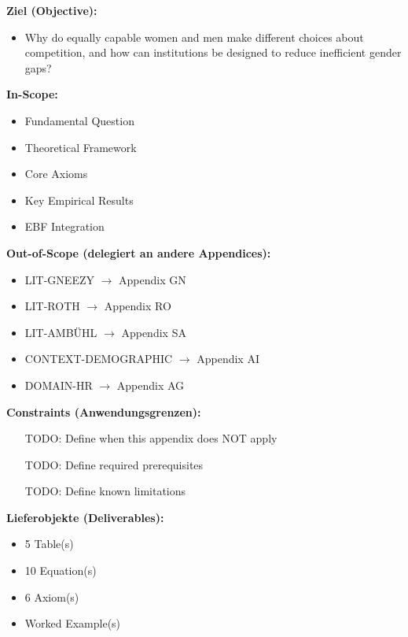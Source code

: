 \begin{tcolorbox}[
    colback=orange!5!white,
    colframe=orange!75!black,
    title={\textbf{Appendix Scope: Ziel / In-Scope / Out-of-Scope / Constraints}},
    fonttitle=\bfseries
]

\textbf{Ziel (Objective):}
\begin{itemize}[nosep]
    \item Why do equally capable women and men make different choices about competition, and how can institutions be designed to reduce inefficient gender gaps?
\end{itemize}

\textbf{In-Scope:}
\begin{itemize}[nosep]
    \item Fundamental Question
    \item Theoretical Framework
    \item Core Axioms
    \item Key Empirical Results
    \item EBF Integration
\end{itemize}

\textbf{Out-of-Scope (delegiert an andere Appendices):}
\begin{itemize}[nosep]
    \item LIT-GNEEZY $\rightarrow$ Appendix GN
    \item LIT-ROTH $\rightarrow$ Appendix RO
    \item LIT-AMBÜHL $\rightarrow$ Appendix SA
    \item CONTEXT-DEMOGRAPHIC $\rightarrow$ Appendix AI
    \item DOMAIN-HR $\rightarrow$ Appendix AG
\end{itemize}

\textbf{Constraints (Anwendungsgrenzen):}
\begin{itemize}[nosep]
    \item [TODO: Define when this appendix does NOT apply]
    \item [TODO: Define required prerequisites]
    \item [TODO: Define known limitations]
\end{itemize}

\textbf{Lieferobjekte (Deliverables):}
\begin{itemize}[nosep]
    \item 5 Table(s)
    \item 10 Equation(s)
    \item 6 Axiom(s)
    \item Worked Example(s)
\end{itemize}

\end{tcolorbox}


